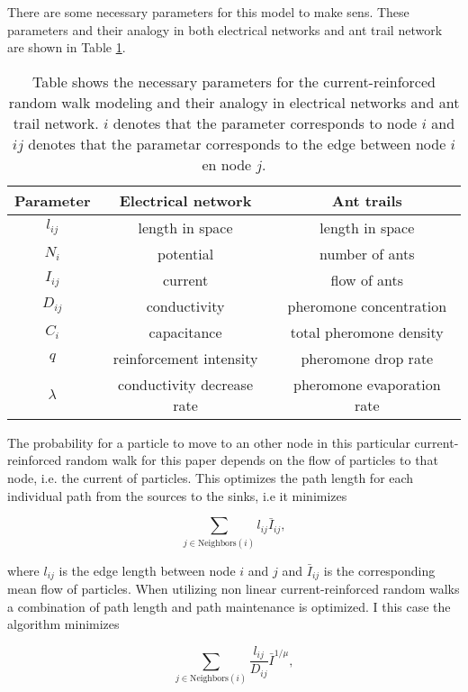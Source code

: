There are some necessary parameters for this model to make sens. These parameters and their analogy in both electrical networks and ant trail network are shown in Table \ref{tab:parameters}.
\begin{table}
\centering
\caption{Table shows the necessary parameters for the current-reinforced random walk modeling and their analogy in electrical networks and ant trail network. $i$ denotes that the parameter corresponds to node $i$ and $ij$ denotes that the parametar corresponds to the edge between node $i$ en node $j$.}
\label{tab:parameters}
\begin{tabular}{ c | c | c }                       
	\textbf{Parameter} & \textbf{Electrical network} & \textbf{Ant trails} \\
	\hline
	$l_{ij}$ & length in space & length in space \\
	\hline
	$N_{i}$ & potential & number of ants \\
	\hline
	$I_{ij}$ & current & flow of ants \\
	\hline
	$D_{ij}$ & conductivity & pheromone concentration \\
	\hline
	$C_{i}$ & capacitance & total pheromone density \\
	\hline
	$q$ & reinforcement intensity & pheromone drop rate \\
	\hline
	$\lambda$ & conductivity decrease rate & pheromone evaporation rate \\
\end{tabular} 
\end{table}

The probability for a particle to move to an other node in this particular current-reinforced random walk for this paper depends on the flow of particles to that node, i.e. the current of particles. This optimizes the path length for each individual path from the sources to the sinks, i.e it minimizes 

\begin{equation}
\sum_{j \in \text{Neighbors}(i)} l_{ij} \bar{I}_{ij},
\end{equation}

\noindent where $l_{ij}$ is the edge length between node $i$ and $j$ and $\bar{I}_{ij}$ is the corresponding mean flow of particles. When utilizing non linear current-reinforced random walks a combination of path length and path maintenance is optimized. I this case the algorithm minimizes

\begin{equation}
\sum_{j \in \text{Neighbors}(i)}\frac{l_{ij}}{D_{ij}}\bar{I}^{1/\mu},
\end{equation}

